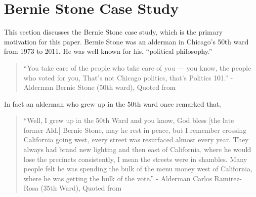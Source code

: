 \section{Bernie Stone Case Study}\label{sec:case_study}
This section discusses the Bernie Stone case study, which is the primary motivation for this paper.
Bernie Stone was an alderman in Chicago's 50th ward from 1973 to 2011.
He was well known for his, ``political philosophy.''

\begin{quotation}
    ``You take care of the people who take care of you — you know, the people who voted for you, That’s not Chicago politics, that’s Politics 101.'' - Alderman Bernie Stone (50th ward), Quoted from~\cite{BGA_berniequote}
\end{quotation}

In fact an alderman who grew up in the 50th ward once remarked that,

\begin{quotation}
    ``Well, I grew up in the 50th Ward and you know, God bless [the late former Ald.] Bernie Stone, may he rest in peace, but I remember crossing California going west, every street was resurfaced almost every year. They always had brand new lighting and then east of California, where he would lose the precincts consistently, I mean the streets were in shambles. Many people felt he was spending the bulk of the menu money west of California, where he was getting the bulk of the vote.'' - Alderman Carlos Ramirez-Rosa (35th Ward), Quoted from~\cite{ramirezrosaquote}
\end{quotation}

